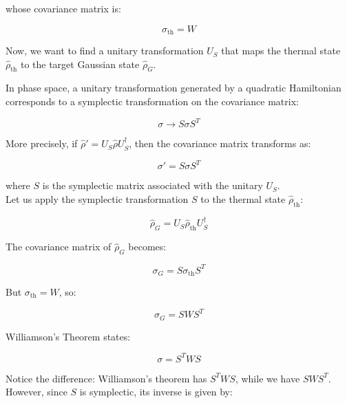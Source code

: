 whose covariance matrix is:

\begin{equation}
    \sigma_{\text{th}} = W
\end{equation}

Now, we want to find a unitary transformation $U_S$ that maps the thermal state $\hat{\rho}_{\text{th}}$ to the target Gaussian state $\hat{\rho}_G$.

In phase space, a unitary transformation generated by a quadratic Hamiltonian corresponds to a symplectic transformation on the covariance matrix:

\begin{equation}
    \sigma \rightarrow S \sigma S^T
\end{equation}

More precisely, if $\hat{\rho}' = U_S \hat{\rho} U_S^\dagger$, then the covariance matrix transforms as:

\begin{equation}
    \sigma' = S \sigma S^T
\end{equation}

where $S$ is the symplectic matrix associated with the unitary $U_S$.\\

Let us apply the symplectic transformation $S$ to the thermal state $\hat{\rho}_{\text{th}}$:

\begin{equation}
    \hat{\rho}_G = U_S \hat{\rho}_{\text{th}} U_S^\dagger
\end{equation}

The covariance matrix of $\hat{\rho}_G$ becomes:

\begin{equation}
    \sigma_G = S \sigma_{\text{th}} S^T
\end{equation}

But $\sigma_{\text{th}} = W$, so:

\begin{equation}
    \sigma_G = S W S^T
\end{equation}

Williamson's Theorem states:

\begin{equation}
    \sigma = S^T W S
\end{equation}

Notice the difference: Williamson's theorem has $S^T W S$, while we have $S W S^T$. However, since $S$ is symplectic, its inverse is given by:

